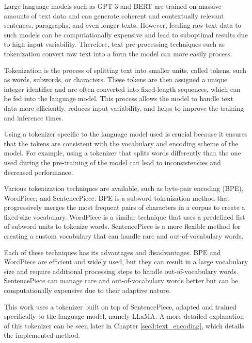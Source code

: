     Large language models such as GPT-3 \cite{brownLanguageModelsAre2020} and BERT \cite{devlinBERTPretrainingDeep2019} are trained on massive amounts of text data and can generate coherent and contextually relevant sentences, paragraphs, and even longer texts. However, feeding raw text data to such models can be computationally expensive and lead to suboptimal results due to high input variability. Therefore, text pre-processing techniques such as tokenization convert raw text into a form the model can more easily process.
    
    Tokenization is the process of splitting text into smaller units, called tokens, such as words, subwords, or characters. These tokens are then assigned a unique integer identifier and are often converted into fixed-length sequences, which can be fed into the language model. This process allows the model to handle text data more efficiently, reduces input variability, and helps to improve the training and inference times.
    
    Using a tokenizer specific to the language model used is crucial because it ensures that the tokens are consistent with the vocabulary and encoding scheme of the model. For example, using a tokenizer that splits words differently than the one used during the pre-training of the model can lead to inconsistencies and decreased performance.
    
    Various tokenization techniques are available, such as byte-pair encoding (BPE), WordPiece, and SentencePiece. BPE is a subword tokenization method that progressively merges the most frequent pairs of characters in a corpus to create a fixed-size vocabulary. WordPiece is a similar technique that uses a predefined list of subword units to tokenize words. SentencePiece is a more flexible method for creating a custom vocabulary that can handle rare and out-of-vocabulary words.
    
    Each of these techniques has its advantages and disadvantages. BPE and WordPiece are efficient and widely used, but they can result in a large vocabulary size and require additional processing steps to handle out-of-vocabulary words. SentencePiece can manage rare and out-of-vocabulary words better but can be computationally expensive due to their adaptive nature.

    This work uses a tokenizer built on top of SentencePiece, adapted and trained specifically to the language model, namely LLaMA. A more detailed explanation of this tokenizer can be seen later in Chapter \ref{sec3:text_encoding}, which details the implemented method.